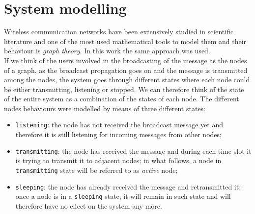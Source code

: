 %
\chapter{System modelling}
\label{modelling}
Wireless communication networks have been extensively studied in scientific
literature and one of the most used mathematical tools to model them and their
behaviour is \textit{graph theory}. In this work the same approach was used.\\
If we think of the users involved in the broadcasting of the message as the
nodes of a graph, as the broadcast propagation goes on and the message is
transmitted among the nodes, the system goes through different states where each
node could be either transmitting, listening or stopped.
We can therefore think of the state of the entire system as a combination of
the states of each node. The different nodes behaviours were modelled by means
of three different states:
\begin{itemize}
	\item \texttt{listening}: the node has not received the broadcast message
	yet and therefore it is still listening for incoming messages from other nodes;
	\item \texttt{transmitting}: the node has received the message and during
	each time slot it is trying to transmit it to adjacent nodes; in what
	follows, a node in \texttt{transmitting} state will be referred to as
	\textit{active} node;
	\item \texttt{sleeping}: the node has already received the message and
	retransmitted it; once a node is in a \texttt{sleeping} state, it will
	remain in such state and will therefore have no	effect on the system any more.
\end{itemize}
